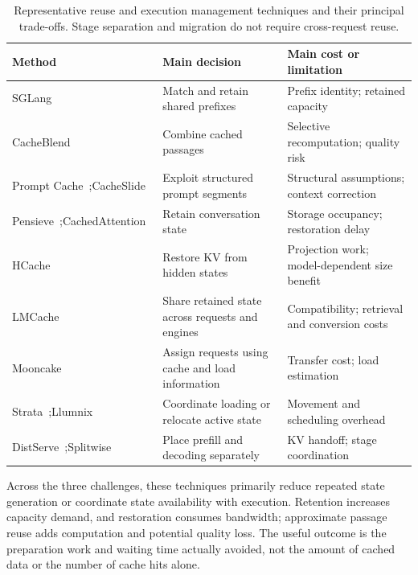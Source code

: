 \begin{table}[t]
    \centering
    \caption{Representative reuse and execution management techniques and their principal trade-offs. Stage separation and migration do not require cross-request reuse.}
    \label{tab:reuse-comparison}
    \begingroup
    \footnotesize
    \setlength{\tabcolsep}{4pt}
    \renewcommand{\arraystretch}{1.15}
    \begin{tabularx}{\textwidth}{@{}>{\raggedright\arraybackslash}p{}>{\raggedright\arraybackslash}p{}>{\raggedright\arraybackslash}X@{}}
        \toprule
        \textbf{Method} & \textbf{Main decision} & \textbf{Main cost or limitation} \\
        \midrule
        SGLang~\cite{kv_zheng2024sglang} & Match and retain shared prefixes & Prefix identity; retained capacity \\
        CacheBlend~\cite{kv_yao2025cacheblend} & Combine cached passages & Selective recomputation; quality risk \\
        Prompt Cache~\cite{kv_gim2024promptcache};\newline CacheSlide~\cite{kv_liu2026cacheslide} & Exploit structured prompt segments & Structural assumptions; context correction \\
        \addlinespace[4pt]
        Pensieve~\cite{kv_yu2025pensieve};\newline CachedAttention~\cite{kv_gao2024cachedattention} & Retain conversation state & Storage occupancy; restoration delay \\
        HCache~\cite{kv_gao2025hcache} & Restore KV from hidden states & Projection work; model-dependent size benefit \\
        LMCache~\cite{kv_liu2025lmcache} & Share retained state across requests and engines & Compatibility; retrieval and conversion costs \\
        \addlinespace[4pt]
        Mooncake~\cite{kv_qin2025mooncake} & Assign requests using cache and load information & Transfer cost; load estimation \\
        Strata~\cite{kv_xie2026strata};\newline Llumnix~\cite{kv_sun2024llumnix} & Coordinate loading or relocate active state & Movement and scheduling overhead \\
        DistServe~\cite{kv_zhong2024distserve};\newline Splitwise~\cite{kv_patel2024splitwise} & Place prefill and decoding separately & KV handoff; stage coordination \\
        \bottomrule
    \end{tabularx}
    \endgroup
\end{table}

Across the three challenges, these techniques primarily reduce repeated state generation or coordinate state availability with execution. Retention increases capacity demand, and restoration consumes bandwidth; approximate passage reuse adds computation and potential quality loss. The useful outcome is the preparation work and waiting time actually avoided, not the amount of cached data or the number of cache hits alone.
